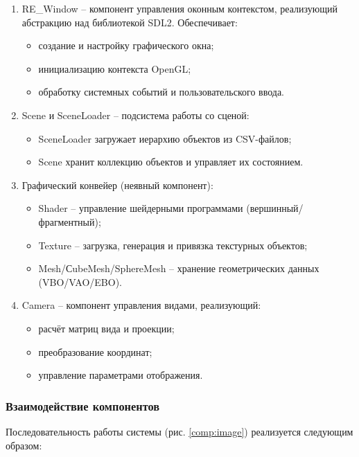 \begin{enumerate}
    \item RE\_Window -- компонент управления оконным контекстом, реализующий абстракцию над библиотекой SDL2. Обеспечивает:
    \begin{itemize}[itemindent=\parindent,leftmargin=\parindent]
        \item создание и настройку графического окна;
        \item инициализацию контекста OpenGL;
        \item обработку системных событий и пользовательского ввода.
    \end{itemize}

    \item Scene и SceneLoader -- подсистема работы со сценой:
    \begin{itemize}[itemindent=\parindent,leftmargin=\parindent]
        \item SceneLoader загружает иерархию объектов из CSV-файлов;
        \item Scene хранит коллекцию объектов и управляет их состоянием.
    \end{itemize}

    \item Графический конвейер (неявный компонент):
    \begin{itemize}[itemindent=\parindent,leftmargin=\parindent]
        \item Shader -- управление шейдерными программами (вершинный/фрагментный);
        \item Texture -- загрузка, генерация и привязка текстурных объектов;
        \item Mesh/СubeMesh/SphereMesh -- хранение геометрических данных (VBO/VAO/EBO).
    \end{itemize}

    \item Camera -- компонент управления видами, реализующий:
    \begin{itemize}[itemindent=\parindent,leftmargin=\parindent]
        \item расчёт матриц вида и проекции;
        \item преобразование координат;
        \item управление параметрами отображения.
    \end{itemize}
\end{enumerate}

\subsubsection{Взаимодействие компонентов}
Последовательность работы системы (рис. \ref{comp:image}) реализуется следующим образом:

